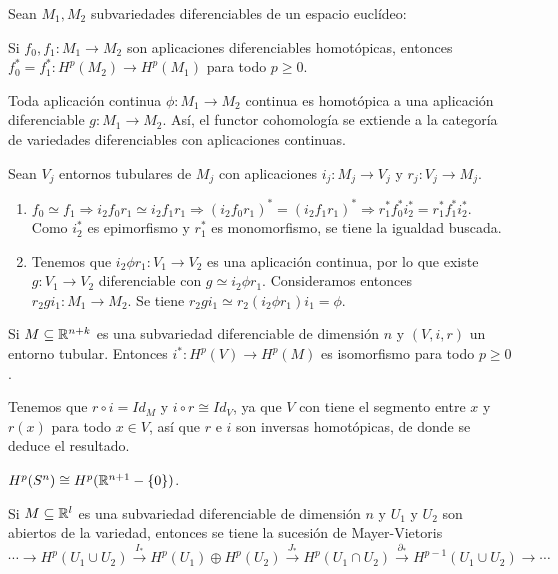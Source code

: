 \documentclass[CV.tex]{subfiles}
\begin{document}
\begin{prop}
Sean $M_1,M_2$ subvariedades diferenciables de un espacio euclídeo:
\item Si $f_0,f_1:M_1\to M_2$ son aplicaciones diferenciables homotópicas, entonces $f_0^*=f_1^*:H^p(M_2)\to H^p(M_1)$ para todo $p\geq 0$.
\item Toda aplicación continua $\phi:M_1\to M_2$ continua es homotópica a una aplicación diferenciable $g:M_1\to M_2$. Así, el functor cohomología se extiende a la categoría de variedades diferenciables con aplicaciones continuas.
\end{prop}
\begin{dem}
Sean $V_j$ entornos tubulares de $M_j$ con aplicaciones $i_j:M_j\to V_j $ y $r_j:V_j\to M_j$.
\begin{enumerate}
\item $f_0\simeq f_1\Rightarrow i_2f_0r_1\simeq i_2f_1r_1\Rightarrow (i_2f_0r_1)^*=(i_2f_1r_1)^*\Rightarrow r_1^*f_0^*i_2^*=r_1^*f_1^*i_2^*$. Como $i_2^*$ es epimorfismo y $r_1^*$ es monomorfismo, se tiene la igualdad buscada.
\item Tenemos que $i_2\phi r_1:V_1\to V_2$ es una aplicación continua, por lo que existe $g:V_1\to V_2$ diferenciable con $g\simeq i_2\phi r_1$. Consideramos entonces $r_2gi_1:M_1\to M_2$. Se tiene $r_2gi_1\simeq r_2(i_2\phi r_1)i_1=\phi$. 
\end{enumerate}
\QED
\end{dem}

\begin{coro}
Si $M\subseteq\mathbb{R}^{n+k}$ es una subvariedad diferenciable de dimensión $n$ y $(V,i,r)$ un entorno tubular. Entonces $i^*:H^p(V)\to H^p(M)$ es isomorfismo para todo $p\geq 0$.
\end{coro}
\begin{dem}
Tenemos que $r\circ i=Id_M$ y $i\circ r\cong Id_V$, ya que $V$ con tiene el segmento entre $x$ y $r(x)$ para todo $x\in V$, así que $r$ e $i$ son inversas homotópicas, de donde se deduce el resultado. \QED
\end{dem}

\begin{ej}
$H^p(S^n)\cong H^p(\mathbb{R}^{n+1}-\{0\})$. 
\end{ej}

\begin{nota}
Si $M\subseteq\mathbb{R}^l$ es una subvariedad diferenciable de dimensión $n$ y $U_1$ y $U_2$ son abiertos de la variedad, entonces se tiene la sucesión de Mayer-Vietoris
\[
\cdots\to H^p(U_1\cup U_2)\xrightarrow{I_*}H^p(U_1)\oplus H^p(U_2)\xrightarrow{J_*}H^p(U_1\cap U_2)\xrightarrow{\partial_*}H^{p-1}(U_1\cup U_2)\to\cdots 
\]
\end{nota}
\end{document}
